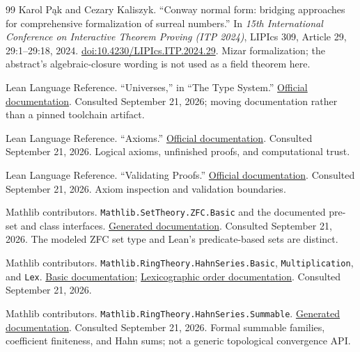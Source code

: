 \documentclass[11pt,letterpaper]{article}
\numberwithin{equation}{section}
\theoremstyle{definition}
\theoremstyle{remark}
\begin{document}
\begin{thebibliography}{99}
Karol P\k ak and Cezary Kaliszyk. ``Conway normal form: bridging approaches for comprehensive formalization of surreal numbers.'' In \emph{15th International Conference on Interactive Theorem Proving (ITP 2024)}, LIPIcs 309, Article 29, 29:1--29:18, 2024.
\href{https://doi.org/10.4230/LIPIcs.ITP.2024.29}{doi:10.4230/LIPIcs.ITP.2024.29}. Mizar formalization; the abstract's algebraic-closure wording is not used as a field theorem here.

Lean Language Reference. ``Universes,'' in ``The Type System.''
\href{https://lean-lang.org/doc/reference/latest/The-Type-System/Universes/}{Official documentation}. Consulted September 21, 2026; moving documentation rather than a pinned toolchain artifact.

Lean Language Reference. ``Axioms.''
\href{https://lean-lang.org/doc/reference/latest/Axioms/}{Official documentation}. Consulted September 21, 2026. Logical axioms, unfinished proofs, and computational trust.

Lean Language Reference. ``Validating Proofs.''
\href{https://lean-lang.org/doc/reference/latest/ValidatingProofs/}{Official documentation}. Consulted September 21, 2026. Axiom inspection and validation boundaries.

Mathlib contributors. \texttt{Mathlib.SetTheory.ZFC.Basic} and the documented pre-set and class interfaces.
\href{https://leanprover-community.github.io/mathlib4_docs/Mathlib/SetTheory/ZFC/Basic.html}{Generated documentation}. Consulted September 21, 2026. The modeled ZFC set type and Lean's predicate-based sets are distinct.

Mathlib contributors. \texttt{Mathlib.RingTheory.HahnSeries.Basic}, \texttt{Multiplication}, and \texttt{Lex}.
\href{https://leanprover-community.github.io/mathlib4_docs/Mathlib/RingTheory/HahnSeries/Basic.html}{Basic documentation};
\href{https://leanprover-community.github.io/mathlib4_docs/Mathlib/RingTheory/HahnSeries/Lex.html}{Lexicographic order documentation}. Consulted September 21, 2026.

Mathlib contributors. \texttt{Mathlib.RingTheory.HahnSeries.Summable}.
\href{https://leanprover-community.github.io/mathlib4_docs/Mathlib/RingTheory/HahnSeries/Summable.html}{Generated documentation}. Consulted September 21, 2026. Formal summable families, coefficient finiteness, and Hahn sums; not a generic topological convergence API.


\end{thebibliography}
\end{document}
